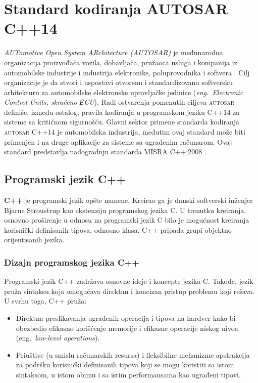 \documentclass[12pt,oneside]{memoir}
\begin{document}
\chapter{Standard kodiranja \textsc{AUTOSAR} C++14}
\label{chp:autosar}

\textit{AUTomotive Open System ARchitecture (\textsc{AUTOSAR})} je međunarodna organizacija proizvođača vozila, dobavljača, pružaoca usluga i kompanija iz automobilske industrije i industrija elektronike, poluprovodnika i softvera \cite{autosarWebsite}. 
Cilj organizacije je da stvori i uspostavi otvorenu i standardizovanu softversku arhitekturu za automobilske elektronske upravljačke jedinice (\textit{eng.~Electronic Control Units, skra\'{c}eno ЕCU}).
Radi ostvarenja pomenutih ciljeva \textsc{autosar} definiše, između ostalog, pravila kodiranja u programskom jeziku C++14 za sisteme sa kriti\v{c}nom sigurno\v{s}\'{c}u. Glavni sektor primene standarda kodiranja \textsc{autosar} C++14 je automobilska industrija, međutim ovaj standard može biti primenjen
i na druge aplikacije za sisteme sa ugrađenim računarom. Ovaj standard predstavlja nadogradnju standarda MISRA C++:2008 \cite{AutosarGuidelines}.

\section{Programski jezik C++}

\textbf{C++} je programski jezik op\v{s}te namene. Kreirao ga je danski softverski in\v{z}enjer Bjarne Stroustrup kao ekstenziju programskog jezika C. U trenutku kreiranja, osnovno pro\v{s}irenje u odnosu na programski jezik C bilo je mogu\'{c}nost kreiranja korisni\v{c}ki definisanih tipova, odnosno klasa. C++ pripada grupi objektno orijentisanih jezika. 

\subsection{Dizajn programskog jezika C++}

Programski jezik C++ zadr\v{z}ava osnovne ideje i koncepte jezika C. Takođe, jezik pru\v{z}a sintaksu koja omogu\'{c}ava direktan i koncizan pristup problemu koji re\v{s}ava.
U svrhu toga, C++ pru\v{z}a:
\begin{itemize}
  \item {Direktna preslikavanja ugrađenih operacija i tipova na hardver kako bi obezbedio efikasno kori\v{s}\'{c}enje memorije i efikasne operacije niskog nivoa (eng.~\textit{low-level operations}).}
  \item {Priu\v{s}tive (u smislu ra\v{c}unarskih resursa) i fleksibilne mehanizme apstrakcija za podr\v{s}ku korisni\v{c}ki definisanih tipova koji se mogu koristiti sa istom sintaksom, u istom obimu i sa istim performansama kao ugrađeni tipovi.}
\end{itemize}
\end{document}
